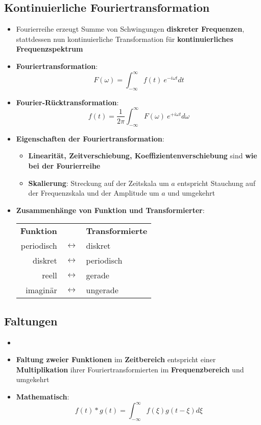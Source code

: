 \subsection{Kontinuierliche Fouriertransformation}%
\label{four:sub:kontinuierliche_fouriertransformation}

\begin{itemize}
	\item Fourierreihe erzeugt Summe von Schwingungen \textbf{diskreter Frequenzen}, stattdessen nun kontinuierliche Transformation für \textbf{kontinuierliches Frequenzspektrum}
	\item \textbf{Fouriertransformation}:
	$$F(\omega) = \int^\infty_{-\infty}f(t)\ e^{-i\omega t}dt$$
	\item \textbf{Fourier-Rücktransformation}:
	$$f(t) = \frac{1}{2\pi}\int^\infty_{-\infty}F(\omega)\ e^{+i\omega t}d\omega$$
	\item \textbf{Eigenschaften der Fouriertransformation}:
	\begin{itemize}
		\item \textbf{Linearität, Zeitverschiebung, Koeffizientenverschiebung} sind \textbf{wie bei der Fourierreihe}
		\item \textbf{Skalierung}: Streckung auf der Zeitskala um $a$ entspricht Stauchung auf der Frequenzskala und der Amplitude um $a$ und umgekehrt
	\end{itemize}
	\item \textbf{Zusammenhänge von Funktion und Transformierter}:
	\begin{center}
		\begin{tabular}{r c l}
			\textbf{Funktion} 	& 					& \textbf{Transformierte}\\
			periodisch 			& $\leftrightarrow$ & diskret\\
			diskret 			& $\leftrightarrow$ & periodisch\\
			reell 				& $\leftrightarrow$ & gerade\\
			imaginär 			& $\leftrightarrow$ & ungerade
		\end{tabular}
	\end{center}
\end{itemize}

\subsection{Faltungen}%
\label{four:sub:faltungen}

\begin{itemize}
	\item {}
	\item \textbf{Faltung zweier Funktionen} im \textbf{Zeitbereich} entspricht einer \textbf{Multiplikation} ihrer Fouriertransformierten im \textbf{Frequenzbereich} und umgekehrt
	\item \textbf{Mathematisch}: $$f(t) * g(t) = \int^\infty_{-\infty}f(\xi)g(t - \xi)d\xi$$
\end{itemize}

